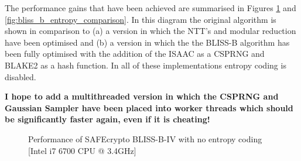 The performance gains that have been achieved are summarised in Figures \ref{fig:bliss_b_no_entropy_comparison} and \ref{fig:bliss_b_entropy_comparison}. In this diagram the original algorithm is shown in comparison to (a) a version in which the NTT's and modular reduction have been optimised and (b) a version in which the the BLISS-B algorithm has been fully optimised with the addition of the ISAAC as a CSPRNG and BLAKE2 as a hash function. In all of these implementations entropy coding is disabled.

\noindent \textbf{I hope to add a multithreaded version in which the CSPRNG and Gaussian Sampler have been placed into worker threads which should be significantly faster again, even if it is cheating!}

\pgfplotsset{compat=1.13,width=12cm,height=8cm}
\begin{figure}[ht!]
\centering
{}
\caption{Performance of SAFEcrypto BLISS-B-IV with no entropy coding [Intel i7 6700 CPU @ 3.4GHz]}
\label{fig:bliss_b_no_entropy_comparison}
\end{figure}

